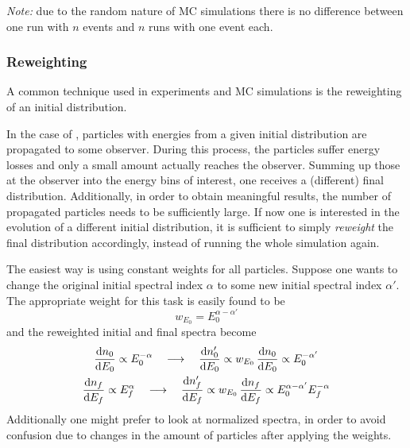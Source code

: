 \emph{Note:} due to the random nature of MC simulations there is no
difference between one run with $n$ events and $n$ runs with one event each.


\subsubsection*{Reweighting}
A common technique used in experiments and MC simulations is the reweighting of
an initial distribution.

In the case of \CRPropa, particles with energies from a given initial
distribution are propagated to some observer. During this process, the
particles suffer energy losses and only a small amount actually reaches the
observer. Summing up those at the observer into the energy bins of
interest, one receives a (different) final distribution.
Additionally, in order to obtain meaningful results, the number of propagated
particles needs to be sufficiently large.
If now one is interested in the evolution of a different initial distribution,
it is sufficient to simply \emph{reweight} the final distribution accordingly,
instead of running the whole simulation again.

The easiest way is using constant weights for all particles. Suppose one wants
to change the original initial spectral index $\alpha$ to some new initial
spectral index $\alpha'$.
The appropriate weight for this task is easily found to be
\begin{equation}
    w_{E_0}=E_0^{\alpha-\alpha'}
    \label{eq:weight}
\end{equation}
and the reweighted initial and final spectra become
\begin{subequations}
\begin{gather}
    \dv{n_0}{E_0}\propto E_0^{-\alpha}
    \quad\longrightarrow\quad
    \dv{n'_0}{E_0}\propto w_{E_0}\,\dv{n_0}{E_0}\propto E_0^{-\alpha'} \\
    \dv{n_f}{E_f}\propto E_f^{\alpha}
    \quad\longrightarrow\quad
    \dv{n'_f}{E_f}\propto w_{E_0}\,\dv{n_f}{E_f}\propto E_0^{\alpha-\alpha'}E_f^{-\alpha}
\end{gather}
\label{eq:reweight}
\end{subequations}
Additionally one might prefer to look at normalized spectra, in order to avoid
confusion due to changes in the amount of particles after applying the weights.


